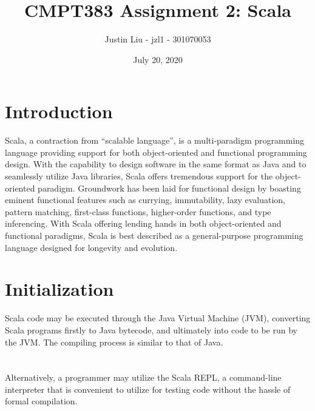 \documentclass[12pt]{report}
\title{\textbf{CMPT383 Assignment 2: Scala}}
\author{Justin Liu - jzl1 - 301070053}
\date{July 20, 2020}
\begin{document}
\begin{titlepage}
\maketitle
\end{titlepage}


\section*{Introduction}

Scala, a contraction from “scalable language”, is a multi-paradigm programming language providing support for both object-oriented and functional programming design. With the capability to design software in the same format as Java and to seamlessly utilize Java libraries, Scala offers tremendous support for the object-oriented paradigm. Groundwork has been laid for functional design by boasting eminent functional features such as currying, immutability, lazy evaluation, pattern matching, first-class functions, higher-order functions, and type inferencing. With Scala offering lending hands in both object-oriented and functional paradigms, Scala is best described as a general-purpose programming language designed for longevity and evolution. 


\section*{Initialization}

Scala code may be executed through the Java Virtual Machine (JVM), converting Scala programs firstly to Java bytecode, and ultimately into code to be run by the JVM. The compiling process is similar to that of Java.\\\\
\\
\newline Alternatively, a programmer may utilize the Scala REPL, a command-line interpreter that is convenient to utilize for testing code without the hassle of formal compilation. \\\\
\\
\end{document}
